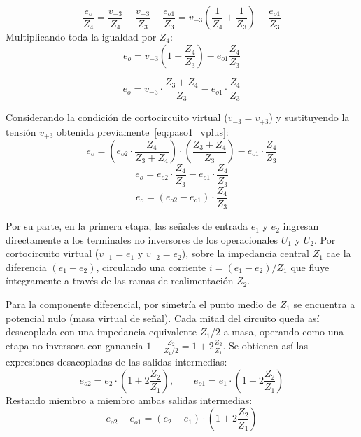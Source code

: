 \begin{equation*}
  \frac{e_o}{Z_4} = \frac{v_{-3}}{Z_4} + \frac{v_{-3}}{Z_3} - \frac{e_{o1}}{Z_3} = v_{-3} \left(\frac{1}{Z_4} + \frac{1}{Z_3}\right) - \frac{e_{o1}}{Z_3}
\end{equation*}
Multiplicando toda la igualdad por $Z_4$:
\begin{equation*}
  e_o = v_{-3} \left(1 + \frac{Z_4}{Z_3}\right) - e_{o1} \frac{Z_4}{Z_3}
\end{equation*}

\begin{equation*}
  e_o = v_{-3} \cdot \frac{Z_3 + Z_4}{Z_3} - e_{o1} \cdot \frac{Z_4}{Z_3}
\end{equation*}

Considerando la condición de cortocircuito virtual ($v_{-3} = v_{+3}$) y sustituyendo la tensión $v_{+3}$ obtenida previamente~\eqref{eq:paso1_vplus}:
\begin{equation*}
  e_o = \left(e_{o2} \cdot \frac{Z_4}{Z_3 + Z_4}\right) \cdot \left(\frac{Z_3 + Z_4}{Z_3}\right) - e_{o1} \cdot \frac{Z_4}{Z_3}
\end{equation*}
\begin{equation*}
  e_o = e_{o2} \cdot \frac{Z_4}{Z_3} - e_{o1} \cdot \frac{Z_4}{Z_3}
\end{equation*}
\begin{equation}
  e_o = (e_{o2} - e_{o1}) \cdot \frac{Z_4}{Z_3}
  \label{eq:eo_restador}
\end{equation}

Por su parte, en la primera etapa, las señales de entrada $e_1$ y $e_2$ ingresan
directamente a los terminales no inversores de los operacionales $U_1$ y $U_2$.
Por cortocircuito virtual ($v_{-1} = e_1$ y $v_{-2} = e_2$), sobre la impedancia
central $Z_1$ cae la diferencia $(e_1 - e_2)$, circulando una
corriente $i = (e_1 - e_2)/Z_1$ que fluye íntegramente a través de las ramas de
realimentación $Z_2$.

Para la componente diferencial, por simetría el punto medio de $Z_1$ se encuentra a potencial nulo (masa virtual de señal). Cada mitad del circuito queda así desacoplada con una impedancia equivalente $Z_1/2$ a masa, operando como una etapa no inversora con ganancia $1 + \frac{Z_2}{Z_1/2} = 1 + 2\frac{Z_2}{Z_1}$. Se obtienen así las expresiones desacopladas de las salidas intermedias:
\begin{equation*}
  e_{o2} = e_2 \cdot \left(1 + 2 \frac{Z_2}{Z_1}\right), \qquad e_{o1} = e_1 \cdot \left(1 + 2 \frac{Z_2}{Z_1}\right)
\end{equation*}
Restando miembro a miembro ambas salidas intermedias:
\begin{equation}
  e_{o2} - e_{o1} = (e_2 - e_1) \cdot \left(1 + 2 \frac{Z_2}{Z_1}\right)
  \label{eq:diff_salidas_etapa1}
\end{equation}

